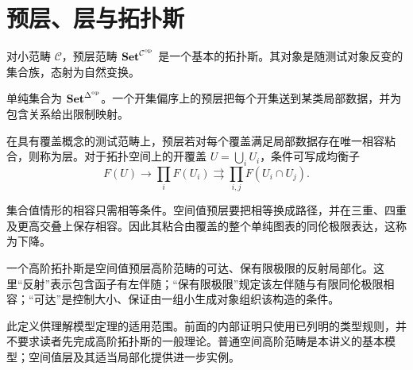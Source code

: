 \section{预层、层与拓扑斯}
\begin{definition}[预层拓扑斯]
对小范畴 $\mathcal C$，预层范畴 $\mathbf{Set}^{\mathcal C^{\mathrm{op}}}$ 是一个基本的拓扑斯。其对象是随测试对象反变的集合族，态射为自然变换。
\end{definition}
\begin{example}
单纯集合为 $\mathbf{Set}^{\Delta^{\mathrm{op}}}$。一个开集偏序上的预层把每个开集送到某类局部数据，并为包含关系给出限制映射。
\end{example}
\begin{definition}[层的粘合条件]
在具有覆盖概念的测试范畴上，预层若对每个覆盖满足局部数据存在唯一相容粘合，则称为层。对于拓扑空间上的开覆盖 $U=\bigcup_iU_i$，条件可写成均衡子
\[
F(U)\longrightarrow\prod_iF(U_i)
\rightrightarrows\prod_{i,j}F(U_i\cap U_j).
\]
\end{definition}
\begin{remark}
集合值情形的相容只需相等条件。空间值预层要把相等换成路径，并在三重、四重及更高交叠上保存相容。因此其粘合由覆盖的整个单纯图表的同伦极限表达，这称为下降。
\end{remark}
\begin{definition}[高阶拓扑斯]
一个高阶拓扑斯是空间值预层高阶范畴的可达、保有限极限的反射局部化。这里“反射”表示包含函子有左伴随；“保有限极限”规定该左伴随与有限同伦极限相容；“可达”是控制大小、保证由一组小生成对象组织该构造的条件。
\end{definition}
\begin{remark}
此定义供理解模型定理的适用范围。前面的内部证明只使用已列明的类型规则，并不要求读者先完成高阶拓扑斯的一般理论。普通空间高阶范畴是本讲义的基本模型；空间值层及其适当局部化提供进一步实例\cite{LurieHTT,RiehlSemantics}。
\end{remark}

